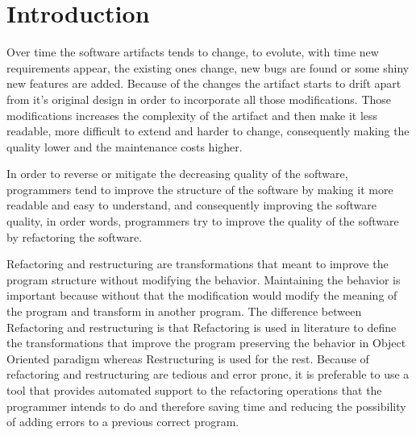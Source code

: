 
% 
% 

\section{Introduction}

Over time the software artifacts tends to change, to evolute, with time new requirements appear, the existing ones change, new bugs are found or some shiny new features are added.
Because of the changes the artifact starts to drift apart from it's original design in order to incorporate all those modifications.
Those modifications increases the complexity of the artifact and then make it less readable, more difficult to extend and harder to change, consequently making the quality lower and the maintenance costs higher. %

In order to reverse or mitigate the decreasing quality of the software, programmers tend to improve the structure of the software by making it more readable and easy to understand, and consequently improving the software quality, in order words, programmers try to improve the quality of the software by refactoring the software.

Refactoring and restructuring are transformations that meant to improve the program structure without modifying the behavior. Maintaining the behavior is important because without that the modification would modify the meaning of the program and transform in another program.
The difference between Refactoring and restructuring is that Refactoring is used in literature to define the transformations that improve the program preserving the behavior in Object Oriented paradigm \cite{opdyke1992refactoring} \cite{fowlerrefactoring1999} whereas Restructuring is used for the rest. \cite{griswold1993automated} \cite{softrest1986} %
Because of refactoring and restructuring are tedious and error prone, it is preferable to use a tool that provides automated support to the refactoring operations that the programmer intends to do and therefore saving time and reducing the possibility of adding errors to a previous correct program.



